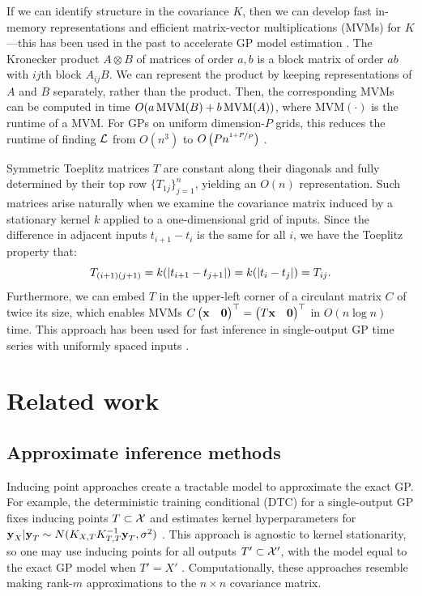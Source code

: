 \documentclass{article}
\begin{document}
If we can identify structure in the covariance $K$, then we can develop fast in-memory representations and efficient matrix-vector multiplications (MVMs) for $K$---this has been used in the past to accelerate GP model estimation \cite{gilboa2015scaling, cunningham2008fast}. The Kronecker product $A\otimes B$ of matrices of order $a,b$ is a block matrix of order $ab$ with $ij$th block $A_{ij}B$. We can represent the product by keeping representations of $A$ and $B$ separately, rather than the product. Then, the corresponding MVMs can be computed in time $O(a\operatorname{MVM}(B)+b\operatorname{MVM}(A))$, where $\text{MVM}(\cdot)$ is the runtime of a MVM. For GPs on uniform dimension-$P$ grids, this reduces the runtime of finding $\mathcal{L}$ from $O(n^3)$ to $O\left({Pn^{\nicefrac{1+P}{P}}}\right)$ \cite{gilboa2015scaling}.

Symmetric Toeplitz matrices $T$ are constant along their diagonals and fully determined by their top row $\{T_{1j}\}_{j=1}^n$, yielding an $O(n)$ representation. Such matrices arise naturally when we examine the covariance matrix induced by a stationary kernel $k$ applied to a one-dimensional grid of inputs. Since the difference in adjacent inputs $t_{i+1}-t_{i}$ is the same for all $i$, we have the Toeplitz property that:
\[
T_{(i+1)(j+1)}=k(\left|t_{i+1} -t_{j+1}\right|)=k(\left|t_i-t_j\right|)=T_{ij}.
\]
Furthermore, we can embed $T$ in the upper-left corner of a circulant matrix $C$ of twice its size, which enables MVMs $C\begin{pmatrix} \textbf{x} & \textbf{0} \end{pmatrix}^\top=\begin{pmatrix} T\textbf{x} &\textbf{0} \end{pmatrix}^\top$ in $O(n\log n)$ time. This approach has been used for fast inference in single-output GP time series with uniformly spaced inputs \cite{cunningham2008fast}.

\section{Related work}
\label{sec:related-work}
\subsection{Approximate inference methods}

Inducing point approaches create a tractable model to approximate the exact GP. For example, the deterministic training conditional (DTC) for a single-output GP fixes inducing points $T\subset\mathcal{X}$ and estimates kernel hyperparameters for $\textbf{y}_{X}|\textbf{y}_{T}\sim N(K_{X,T}K_{T,T}^{-1}\textbf{y}_T,\sigma^2)$ \cite{quinonero2005unifying}. This approach is agnostic to kernel stationarity, so one may use inducing points for all outputs $T'\subset \mathcal{X}'$, with the model equal to the exact GP model when $T'={X'}$ \cite{alvarez2010efficient}. Computationally, these approaches resemble making rank-$m$ approximations to the $n\times n$ covariance matrix.
\end{document}
